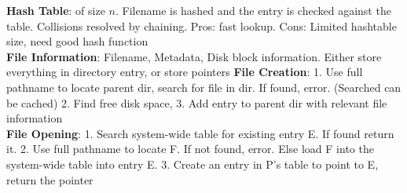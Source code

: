 \documentclass{article}
\begin{document}
{\begin{multicols*}{3}
\textbf{Hash Table}: of size $n$. Filename is hashed and the entry is checked against the table. Collisions resolved by chaining. Pros: fast lookup. Cons: Limited hashtable size, need good hash function\\
\textbf{File Information}: Filename, Metadata, Disk block information. Either store everything in directory entry, or store pointers
\textbf{File Creation}: 1. Use full pathname to locate parent dir, search for file in dir. If found, error. (Searched can be cached) 2. Find free disk space, 3. Add entry to parent dir with relevant file information\\
\textbf{File Opening}: 1. Search system-wide table for existing entry E. If found return it. 2. Use full pathname to locate F. If not found, error. Else load F into the system-wide table into entry E. 3. Create an entry in P's table to point to E, return the pointer

\end{multicols*}}
\end{document}
